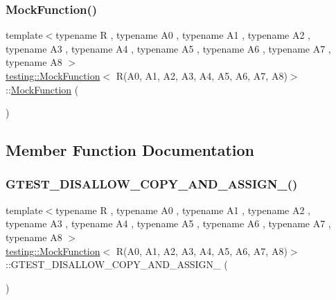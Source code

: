 \subsubsection{\texorpdfstring{MockFunction()}{MockFunction()}}
{\footnotesize\ttfamily template$<$typename R , typename A0 , typename A1 , typename A2 , typename A3 , typename A4 , typename A5 , typename A6 , typename A7 , typename A8 $>$ \\
\mbox{\hyperlink{classtesting_1_1_mock_function}{testing\+::\+Mock\+Function}}$<$ R(A0, A1, A2, A3, A4, A5, A6, A7, A8)$>$\+::\mbox{\hyperlink{classtesting_1_1_mock_function}{Mock\+Function}} (\begin{DoxyParamCaption}{ }\end{DoxyParamCaption})\hspace{0.3cm}{\ttfamily [inline]}}



\subsection{Member Function Documentation}
\mbox{\label{classtesting_1_1_mock_function_3_01_r_07_a0_00_01_a1_00_01_a2_00_01_a3_00_01_a4_00_01_a5_00_01_a6_00_01_a7_00_01_a8_08_4_ab2fa9029953595acdbbfc95b7544cb92}} 
\subsubsection{\texorpdfstring{GTEST\_DISALLOW\_COPY\_AND\_ASSIGN\_()}{GTEST\_DISALLOW\_COPY\_AND\_ASSIGN\_()}}
{\footnotesize\ttfamily template$<$typename R , typename A0 , typename A1 , typename A2 , typename A3 , typename A4 , typename A5 , typename A6 , typename A7 , typename A8 $>$ \\
\mbox{\hyperlink{classtesting_1_1_mock_function}{testing\+::\+Mock\+Function}}$<$ R(A0, A1, A2, A3, A4, A5, A6, A7, A8)$>$\+::G\+T\+E\+S\+T\+\_\+\+D\+I\+S\+A\+L\+L\+O\+W\+\_\+\+C\+O\+P\+Y\+\_\+\+A\+N\+D\+\_\+\+A\+S\+S\+I\+G\+N\+\_\+ (\begin{DoxyParamCaption}\item[{\mbox{\hyperlink{classtesting_1_1_mock_function}{Mock\+Function}}$<$ R(A0, A1, A2, A3, A4, A5, A6, A7, A8)$>$}]{ }\end{DoxyParamCaption})\hspace{0.3cm}{\ttfamily [private]}}

